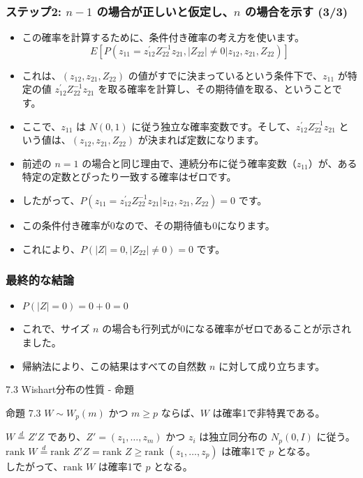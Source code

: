 \documentclass[aspectratio=169]{beamer}
\begin{document}
\begin{frame}
\frametitle{ステップ2: $n-1$ の場合が正しいと仮定し、$n$ の場合を示す (3/3)}
\begin{itemize}
    \item この確率を計算するために、条件付き確率の考え方を使います。
    \[ E[P(z_{11}=z_{12}^{\prime}Z_{22}^{-1}z_{21},|Z_{22}|\ne0|z_{12},z_{21},Z_{22})] \]
    \item これは、$(z_{12},z_{21},Z_{22})$ の値がすでに決まっているという条件下で、$z_{11}$ が特定の値 $z_{12}^{\prime}Z_{22}^{-1}z_{21}$ を取る確率を計算し、その期待値を取る、ということです。
    \item ここで、$z_{11}$ は $N(0,1)$ に従う独立な確率変数です。そして、$z_{12}^{\prime}Z_{22}^{-1}z_{21}$ という値は、$(z_{12},z_{21},Z_{22})$ が決まれば定数になります。
    \item 前述の $n=1$ の場合と同じ理由で、連続分布に従う確率変数（$z_{11}$）が、ある特定の定数とぴったり一致する確率はゼロです。
    \item したがって、$P(z_{11}=z_{12}^{\prime}Z_{22}^{-1}z_{21}|z_{12},z_{21},Z_{22})=0$ です。
    \item この条件付き確率が0なので、その期待値も0になります。
    \item これにより、$P(|Z|=0,|Z_{22}|\ne0)=0$ です。
\end{itemize}
\end{frame}

\begin{frame}
\frametitle{最終的な結論}
\begin{itemize}
    \item $P(|Z|=0)=0+0=0$
    \item これで、サイズ $n$ の場合も行列式が0になる確率がゼロであることが示されました。
    \item 帰納法により、この結果はすべての自然数 $n$ に対して成り立ちます。
\end{itemize}
\end{frame}

\begin{frame}{7.3 Wishart分布の性質 - 命題}
\begin{block}{命題 7.3}
$W \sim W_p(m)$ かつ $m \ge p$ ならば、$W$ は確率1で非特異である。
\end{block}

$W \overset{d}{=} Z'Z$ であり、$Z' = (z_1, \dots, z_m)$ かつ $z_i$ は独立同分布の $N_p(0, I)$ に従う。\\
$\text{rank } W \overset{d}{=} \text{rank } Z'Z = \text{rank } Z \ge \text{rank } (z_1, \dots, z_p)$ は確率1で $p$ となる。\\
したがって、$\text{rank } W$ は確率1で $p$ となる。
\end{frame}
\end{document}
